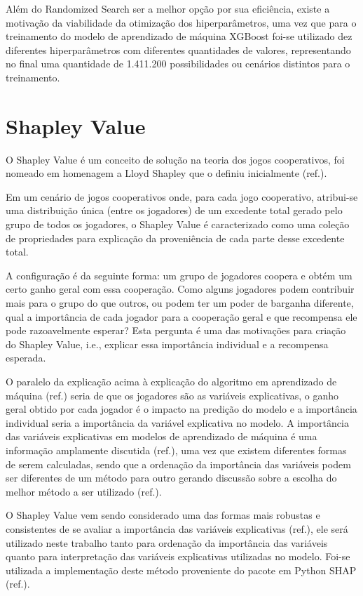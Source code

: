 Além do Randomized Search ser a melhor opção por sua eficiência, existe a motivação da viabilidade da otimização dos hiperparâmetros, uma vez que para o treinamento do modelo de aprendizado de máquina XGBoost foi-se utilizado dez diferentes hiperparâmetros com diferentes quantidades de valores, representando no final uma quantidade de 1.411.200 possibilidades ou cenários distintos para o treinamento.

\section{Shapley Value}
\label{sec:shapley_value}

O Shapley Value é um conceito de solução na teoria dos jogos cooperativos, foi nomeado em homenagem a Lloyd Shapley que o definiu inicialmente (ref.). 

Em um cenário de jogos cooperativos onde, para cada jogo cooperativo, atribui-se uma distribuição única (entre os jogadores) de um excedente total gerado pelo grupo de todos os jogadores, o Shapley Value é caracterizado como uma coleção de propriedades para explicação da proveniência de cada parte desse excedente total.

A configuração é da seguinte forma: um grupo de jogadores coopera e obtém um certo ganho geral com essa cooperação. Como alguns jogadores podem contribuir mais para o grupo do que outros, ou podem ter um poder de barganha diferente, qual a importância de cada jogador para a cooperação geral e que recompensa ele pode razoavelmente esperar? Esta pergunta é uma das motivações para criação do Shapley Value, i.e., explicar essa importância individual e a recompensa esperada.

O paralelo da explicação acima à explicação do algoritmo em aprendizado de máquina (ref.) seria de que os jogadores são as variáveis explicativas, o ganho geral obtido por cada jogador é o impacto na predição do modelo e a importância individual seria a importância da variável explicativa no modelo. A importância das variáveis explicativas em modelos de aprendizado de máquina é uma informação amplamente discutida (ref.), uma vez que existem diferentes formas de serem calculadas, sendo que a ordenação da importância das variáveis podem ser diferentes de um método para outro gerando discussão sobre a escolha do melhor método a ser utilizado (ref.).

O Shapley Value vem sendo considerado uma das formas mais robustas e consistentes de se avaliar a importância das variáveis explicativas (ref.), ele será utilizado neste trabalho tanto para ordenação da importância das variáveis quanto para interpretação das variáveis explicativas utilizadas no modelo. Foi-se utilizada a implementação deste método proveniente do pacote em Python SHAP (ref.).


